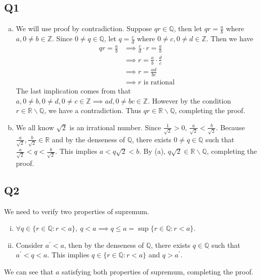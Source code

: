 \documentclass[12pt,lettersize]{article}
\theoremstyle{remark}
\newcommand{\R}{\mathbb{R}}
\newcommand{\Q}{\mathbb{Q}}
\newcommand{\Z}{\mathbb{Z}}
\begin{document}
\subsection*{Q1}
\begin{enumerate}[(a)]
	\item We will use proof by contradiction. Suppose $qr\in\Q$, then let $qr=\frac{a}{b}$ where $a,0\neq b\in\Z$. Since $0\neq q\in\Q$, let $q=\frac{c}{d}$ where $0\neq c, 0\neq d\in\Z$. Then we have
	\begin{align*}
		qr=\frac{a}{b} &\implies \frac{c}{d}\cdot r=\frac{a}{b}\\
					   &\implies r=\frac{a}{b}\cdot\frac{d}{c}\\
					   &\implies r=\frac{ad}{bc}\\
					   &\implies \text{$r$ is rational}
	\end{align*}
	The last implication comes from that $a,0\neq b, 0\neq d,0\neq c\in\Z\implies ad,0\neq bc\in\Z$. However by the condition $r\in\R\backslash\Q$, we have a contradiction. Thus $qr\in\R\backslash\Q$, completing the proof.
	\item We all know $\sqrt{2}$ is an irrational number. Since $\frac{1}{\sqrt{2}}>0$, $\frac{a}{\sqrt{2}}<\frac{b}{\sqrt{2}}$. Because $\frac{a}{\sqrt{2}},\frac{b}{\sqrt{2}}\in\R$ and by the denseness of $\Q$, there exists $0\neq q\in\Q$ such that $\frac{a}{\sqrt{2}}<q<\frac{b}{\sqrt{2}}$. This implies $a<q\sqrt{2}<b$. By (a), $q\sqrt{2}\in\R\backslash\Q$, completing the proof. 
\end{enumerate}

\newpage

\subsection*{Q2}

We need to verify two properties of supremum. 
\begin{enumerate}[(i)]
	\item $\forall q\in\{r\in\Q: r<a\},\ q<a\implies q\leq a=\sup\{r\in\Q: r<a\}$.
	\item Consider $a^\prime<a$, then by the denseness of $\Q$, there exists $q\in\Q$ such that $a^\prime<q<a$. This implies $q\in\{r\in\Q: r<a\}$ and $q>a^\prime$. 	
\end{enumerate}
We can see that $a$ satisfying both properties of supremum, completing the proof.
\newpage
\end{document}
